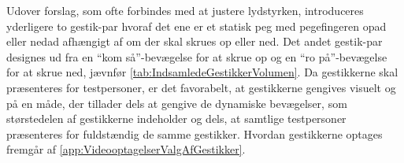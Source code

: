 Udover forslag, som ofte forbindes med at justere lydstyrken, introduceres yderligere to gestik-par hvoraf det ene er et statisk peg med pegefingeren opad eller nedad afhængigt af om der skal skrues op eller ned. Det andet gestik-par designes ud fra en \enquote{kom så}-bevægelse for at skrue op og en \enquote{ro på}-bevægelse for at skrue ned, jævnfør \autoref{tab:IndsamledeGestikkerVolumen}. \blankline
%
Da gestikkerne skal præsenteres for testpersoner, er det favorabelt, at gestikkerne gengives visuelt og på en måde, der tillader dels at gengive de dynamiske bevægelser, som størstedelen af gestikkerne indeholder og dels, at samtlige testpersoner præsenteres for fuldstændig de samme gestikker. Hvordan gestikkerne optages fremgår af \autoref{app:VideooptagelserValgAfGestikker}.
%
